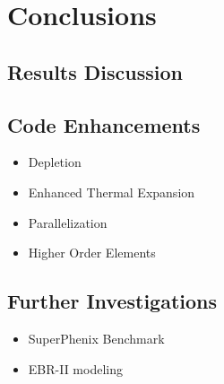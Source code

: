 \chapter{Conclusions}
\label{ch:coupledResults}

\section{Results Discussion}

\section{Code Enhancements}
  \begin{itemize}
    \item Depletion
    \item Enhanced Thermal Expansion
    \item Parallelization
    \item Higher Order Elements
  \end{itemize}

\section{Further Investigations}
  \begin{itemize}
    \item SuperPhenix Benchmark
    \item EBR-II modeling
  \end{itemize}
